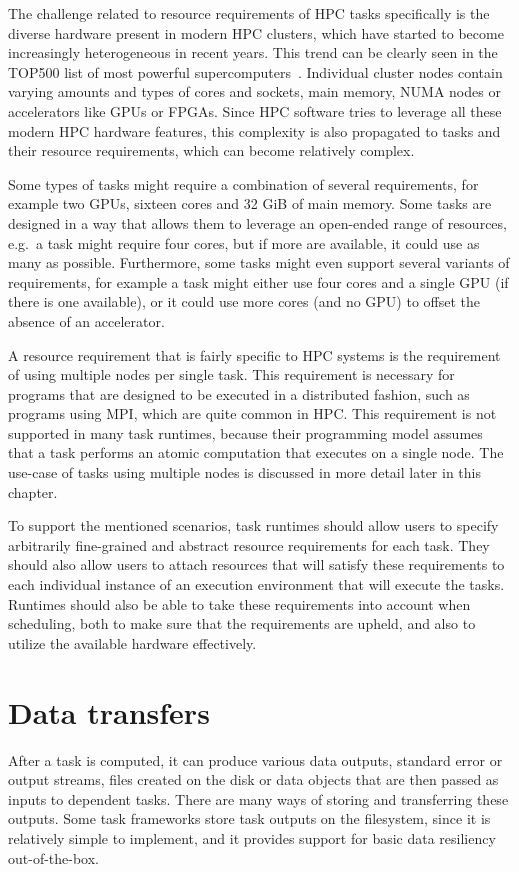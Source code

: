 The challenge related to resource requirements of HPC tasks specifically is the diverse hardware
present in modern HPC clusters, which have started to become increasingly heterogeneous in recent
years. This trend can be clearly seen in the TOP500 list of most powerful
supercomputers~\cite{top500analysis}. Individual cluster nodes contain varying amounts and
types of cores and sockets, main memory, NUMA nodes or accelerators like GPUs or FPGAs. Since HPC
software tries to leverage all these modern HPC hardware features, this complexity is also
propagated to tasks and their resource requirements, which can become relatively complex.

Some types of tasks might require a combination of several requirements, for example two GPUs,
sixteen cores and 32 GiB of main memory. Some tasks are designed in a way that allows them to
leverage an open-ended range of resources, e.g.\ a task might require four cores, but if more are
available, it could use as many as possible. Furthermore, some tasks might even support several
variants of requirements, for example a task might either use four cores and a single GPU (if there
is one available), or it could use more cores (and no GPU) to offset the absence of an accelerator.

A resource requirement that is fairly specific to HPC systems is the requirement of using multiple
nodes per single task. This requirement is necessary for programs that are designed to be executed
in a distributed fashion, such as programs using MPI, which are quite common in HPC. This
requirement is not supported in many task runtimes, because their programming model assumes that a
task performs an atomic computation that executes on a single node. The use-case of tasks using
multiple nodes is discussed in more detail later in this chapter.

To support the mentioned scenarios, task runtimes should allow users to specify arbitrarily
fine-grained and abstract resource requirements for each task. They should also allow users to
attach resources that will satisfy these requirements to each individual instance of an execution
environment that will execute the tasks. Runtimes should also be able to take these requirements
into account when scheduling, both to make sure that the requirements are upheld, and also to
utilize the available hardware effectively.


\section{Data transfers}
After a task is computed, it can produce various data outputs, standard error or output streams,
files created on the disk or data objects that are then passed as inputs to dependent tasks. There
are many ways of storing and transferring these outputs. Some task frameworks store task outputs on
the filesystem, since it is relatively simple to implement, and it provides support for basic data
resiliency out-of-the-box.

